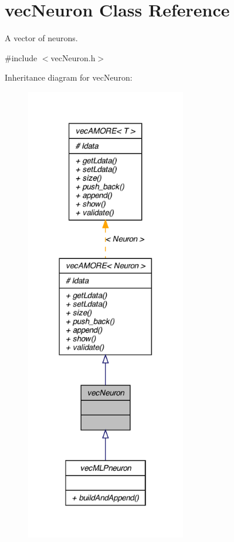 \hypertarget{classvec_neuron}{
\section{vecNeuron Class Reference}
\label{classvec_neuron}
}


A vector of neurons.  




{\ttfamily \#include $<$vecNeuron.h$>$}



Inheritance diagram for vecNeuron:\nopagebreak
\begin{figure}[H]
\begin{center}
\leavevmode
\includegraphics[width=198pt]{classvec_neuron__inherit__graph}
\end{center}
\end{figure}


